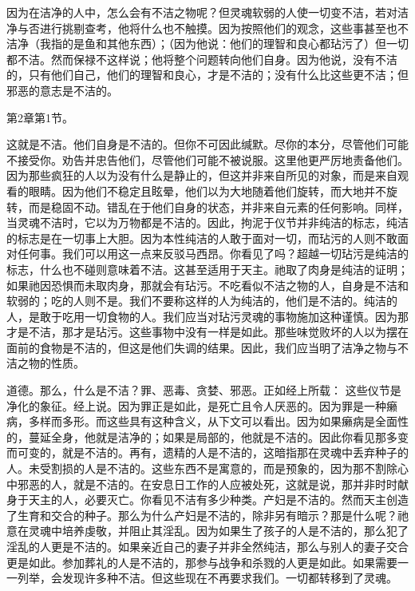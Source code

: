 因为在洁净的人中，怎么会有不洁之物呢？但灵魂软弱的人使一切变不洁，若对洁净与否进行挑剔查考，他将什么也不触摸。因为按照他们的观念，这些事甚至也不洁净（我指的是鱼和其他东西）；（因为他说：他们的理智和良心都玷污了）但一切都不洁。然而保禄不这样说；他将整个问题转向他们自身。因为他说，没有不洁的，只有他们自己，他们的理智和良心，才是不洁的；没有什么比这些更不洁；但邪恶的意志是不洁的。\par

\par

第2章第1节。\par

这就是不洁。他们自身是不洁的。但你不可因此缄默。尽你的本分，尽管他们可能不接受你。劝告并忠告他们，尽管他们可能不被说服。这里他更严厉地责备他们。因为那些疯狂的人以为没有什么是静止的，但这并非来自所见的对象，而是来自观看的眼睛。因为他们不稳定且眩晕，他们以为大地随着他们旋转，而大地并不旋转，而是稳固不动。错乱在于他们自身的状态，并非来自元素的任何影响。同样，当灵魂不洁时，它以为万物都是不洁的。因此，拘泥于仪节并非纯洁的标志，纯洁的标志是在一切事上大胆。因为本性纯洁的人敢于面对一切，而玷污的人则不敢面对任何事。我们可以用这一点来反驳马西昂。你看见了吗？超越一切玷污是纯洁的标志，什么也不碰则意味着不洁。这甚至适用于天主。祂取了肉身是纯洁的证明；如果祂因恐惧而未取肉身，那就会有玷污。不吃看似不洁之物的人，自身是不洁和软弱的；吃的人则不是。我们不要称这样的人为纯洁的，他们是不洁的。纯洁的人，是敢于吃用一切食物的人。我们应当对玷污灵魂的事物施加这种谨慎。因为那才是不洁，那才是玷污。这些事物中没有一样是如此。那些味觉败坏的人以为摆在面前的食物是不洁的，但这是他们失调的结果。因此，我们应当明了洁净之物与不洁之物的性质。\par

道德。那么，什么是不洁？罪、恶毒、贪婪、邪恶。正如经上所载：   这些仪节是净化的象征。经上说。因为罪正是如此，是死亡且令人厌恶的。因为罪是一种癞病，多样而多形。而这些具有这种含义，从下文可以看出。因为如果癞病是全面性的，蔓延全身，他就是洁净的；如果是局部的，他就是不洁的。因此你看见那多变而可变的，就是不洁的。再有，遗精的人是不洁的，这暗指那在灵魂中丢弃种子的人。未受割损的人是不洁的。这些东西不是寓意的，而是预象的，因为那不割除心中邪恶的人，就是不洁的。在安息日工作的人应被处死，这就是说，那并非时时献身于天主的人，必要灭亡。你看见不洁有多少种类。产妇是不洁的。然而天主创造了生育和交合的种子。那么为什么产妇是不洁的，除非另有暗示？那是什么呢？祂意在灵魂中培养虔敬，并阻止其淫乱。因为如果生了孩子的人是不洁的，那么犯了淫乱的人更是不洁的。如果亲近自己的妻子并非全然纯洁，那么与别人的妻子交合更是如此。参加葬礼的人是不洁的，那参与战争和杀戮的人更是如此。如果需要一一列举，会发现许多种不洁。但这些现在不再要求我们。一切都转移到了灵魂。\par

